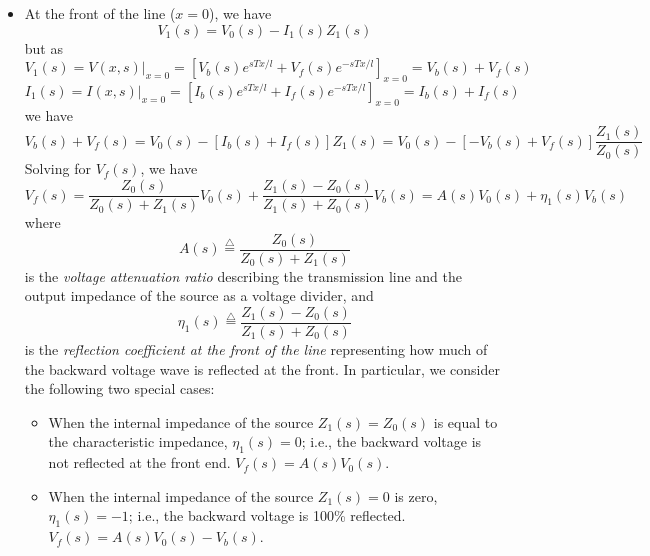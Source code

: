 \begin{itemize}
\item At the front of the line ($x=0$), we have
  \[	V_1(s)=V_0(s)-I_1(s)Z_1(s)	\]
  but as
  \[ V_1(s)=V(x,s)|_{x=0}=\left[V_b(s)e^{sTx/l}+V_f(s)e^{-sTx/l}\right]_{x=0}=V_b(s)+V_f(s) \]
  \[ I_1(s)=I(x,s)|_{x=0}=\left[I_b(s)e^{sTx/l}+I_f(s)e^{-sTx/l}\right]_{x=0}=I_b(s)+I_f(s) \]
  we have
  \[ V_b(s)+V_f(s)=V_0(s)-[I_b(s)+I_f(s)]Z_1(s)
  =V_0(s)-[-V_b(s)+V_f(s)]\frac{Z_1(s)}{Z_0(s)}	\]
  Solving for $V_f(s)$, we have
  \[V_f(s)=\frac{Z_0(s)}{Z_0(s)+Z_1(s)}V_0(s)+\frac{Z_1(s)-Z_0(s)}{Z_1(s)+Z_0(s)}V_b(s)
  =A(s)V_0(s)+\eta_1(s)V_b(s)	\]
  where
  \[	A(s)\stackrel{\triangle}{=}\frac{Z_0(s)}{Z_0(s)+Z_1(s)}	\]
  is the {\em voltage attenuation ratio} describing the transmission 
  line and the output impedance of the source as a voltage divider, and
  \[ \eta_1(s)\stackrel{\triangle}{=}\frac{Z_1(s)-Z_0(s)}{Z_1(s)+Z_0(s)} \]
  is the {\em reflection coefficient at the front of the line} representing 
  how much of the backward voltage wave is reflected at the front. In
  particular, we consider the following two special cases:
  \begin{itemize}
  \item When the internal impedance of the source $Z_1(s)=Z_0(s)$ is equal to
    the characteristic impedance, $\eta_1(s)=0$; i.e., the backward voltage 
    is not reflected at the front end. $V_f(s)=A(s) V_0(s)$.
  \item When the internal impedance of the source $Z_1(s)=0$ is zero,
    $\eta_1(s)=-1$; i.e., the backward voltage is 100\% reflected.
    $V_f(s)=A(s)V_0(s)-V_b(s)$.
  \end{itemize}


\end{itemize}
